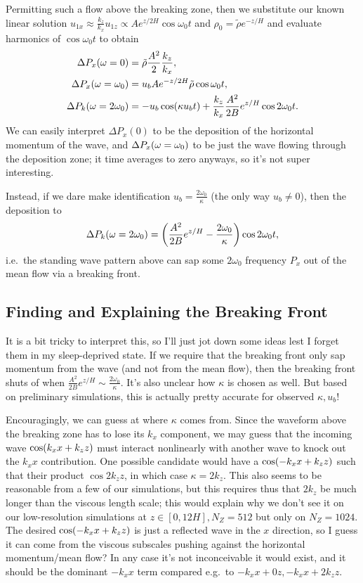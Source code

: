 \documentclass[11pt,
        usenames, %
        dvipsnames %
    ]{report}
\DeclarePairedDelimiter\p{\lparen}{\rparen}
\begin{document}
Permitting such a flow above the breaking zone, then we substitute our known
linear solution $u_{1x} \approx \frac{k_z}{k_x} u_{1z} \propto Ae^{z / 2H}\cos
\omega_0 t$ and $\rho_0 = \tilde{\rho}e^{-z/H}$ and evaluate harmonics of $\cos
\omega_0 t$ to obtain
\begin{align}
    \Delta P_x\p*{\omega = 0} &= \tilde{\rho}\frac{A^2}{2}\frac{k_z}{k_x},\\
    \Delta P_x\p*{\omega = \omega_0}
        &= u_b Ae^{-z/2H}\tilde{\rho}\cos \omega_0 t,\\
    \Delta P_k(\omega = 2\omega_0) &=
        -u_b \cos (\kappa u_bt)
            + \frac{k_z}{k_x}\frac{A^2}{2B}e^{z/H} \cos 2 \omega_0 t.
\end{align}
We can easily interpret $\Delta P_x(0)$ to be the deposition of the horizontal
momentum of the wave, and $\Delta P_x\p*{\omega = \omega_0}$ to be just the wave
flowing through the deposition zone; it time averages to zero anyways, so it's
not super interesting.

Instead, if we dare make identification $u_b = \frac{2\omega_0}{\kappa}$ (the
only way $u_b \neq 0$), then the deposition to
\begin{equation}
    \Delta P_k\p*{\omega = 2\omega_0} = \p*{\frac{A^2}{2B}e^{z/H} -
        \frac{2\omega_0}{\kappa}}\cos 2\omega_0 t,
\end{equation}
i.e.\ the standing wave pattern above can sap some $2\omega_0$ frequency $P_x$
out of the mean flow via a breaking front.

\subsection{Finding and Explaining the Breaking Front}

It is a bit tricky to interpret this, so I'll just jot down some ideas lest I
forget them in my sleep-deprived state. If we require that the breaking front
only sap momentum from the wave (and not from the mean flow), then the breaking
front shuts of when $\frac{A^2}{2B}e^{z/H} \sim \frac{2\omega_0}{\kappa}$. It's
also unclear how $\kappa$ is chosen as well. But based on preliminary
simulations, this is actually pretty accurate for observed $\kappa, u_b$!

Encouragingly, we can guess at where $\kappa$ comes from. Since the waveform
above the breaking zone has to lose its $k_x$ component, we may guess that the
incoming wave $\cos \p*{k_xx + k_zz}$ must interact nonlinearly  with another
wave to knock out the $k_xx$ contribution. One possible candidate would have a
$\cos \p*{-k_xx + k_zz}$ such that their product $\cos 2k_zz$, in which case
$\kappa = 2k_z$. This also seems to be reasonable from a few of our simulations,
but this requires thus that $2k_z$ be much longer than the viscous length scale;
this would explain why we don't see it on our low-resolution simulations at $z
\in [0, 12H], N_Z = 512$ but only on $N_Z = 1024$. The desired $\cos \p*{-k_xx +
k_zz}$ is just a reflected wave in the $x$ direction, so I guess it can come
from the viscous subscales pushing against the horizontal momentum/mean flow?
In any case it's not inconceivable it would exist, and it should be the dominant
$-k_xx$ term compared e.g.\ to $-k_xx + 0z, -k_xx + 2k_zz$.
\end{document}
